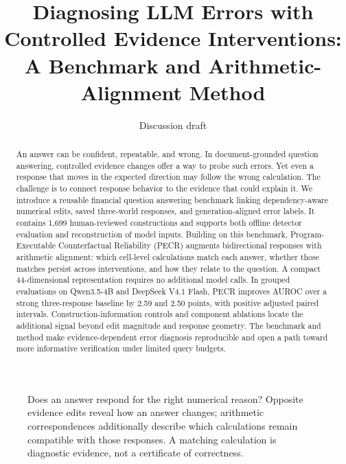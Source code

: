 \title{Diagnosing LLM Errors with Controlled Evidence Interventions:\protect\\A Benchmark and Arithmetic-Alignment Method}
\author{Discussion draft}

\maketitle

\begin{abstract}
An answer can be confident, repeatable, and wrong. In document-grounded question answering, controlled evidence changes offer a way to probe such errors. Yet even a response that moves in the expected direction may follow the wrong calculation. The challenge is to connect response behavior to the evidence that could explain it. We introduce a reusable financial question answering benchmark linking dependency-aware numerical edits, saved three-world responses, and generation-aligned error labels. It contains 1,699 human-reviewed constructions and supports both offline detector evaluation and reconstruction of model inputs. Building on this benchmark, Program-Executable Counterfactual Reliability (PECR) augments bidirectional responses with arithmetic alignment: which cell-level calculations match each answer, whether those matches persist across interventions, and how they relate to the question. A compact 44-dimensional representation requires no additional model calls. In grouped evaluations on Qwen3.5-4B and DeepSeek V4.1 Flash, PECR improves AUROC over a strong three-response baseline by 2.59 and 2.50 points, with positive adjusted paired intervals. Construction-information controls and component ablations locate the additional signal beyond edit magnitude and response geometry. The benchmark and method make evidence-dependent error diagnosis reproducible and open a path toward more informative verification under limited query budgets.
\end{abstract}

\begin{figure}[t]
\centering
{}
\caption{Does an answer respond for the right numerical reason? Opposite evidence edits reveal how an answer changes; arithmetic correspondences additionally describe which calculations remain compatible with those responses. A matching calculation is diagnostic evidence, not a certificate of correctness.}
\label{fig:teaser}
\end{figure}

